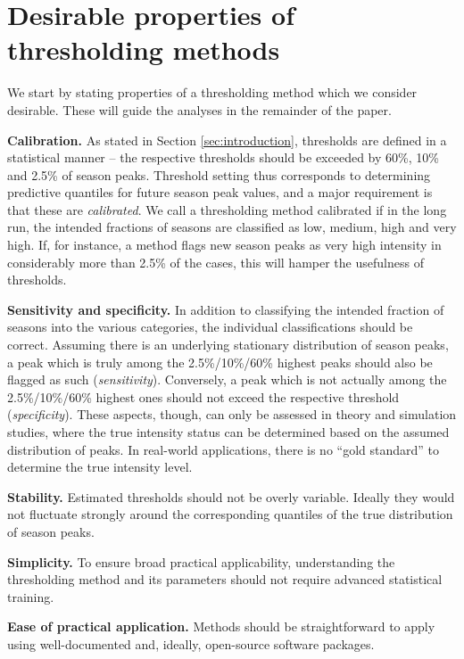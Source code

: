 \documentclass[12pt]{article}
\begin{document}
\section{Desirable properties of thresholding methods}
\label{sec:desirable_properties}

We start by stating properties of a thresholding method which we consider desirable. These will guide the analyses in the remainder of the paper.

\begin{description}
\item \textbf{Calibration.} As stated in Section \ref{sec:introduction}, thresholds are defined in a statistical manner -- the respective thresholds should be exceeded by 60\%, 10\% and 2.5\% of season peaks. Threshold setting thus corresponds to determining predictive quantiles for future season peak values, and a major requirement is that these are \textit{calibrated}. We call a thresholding method calibrated if in the long run, the intended fractions of seasons are classified as low, medium, high and very high. If, for instance, a method flags new season peaks as very high intensity in considerably more than 2.5\% of the cases, this will hamper the usefulness of thresholds.
\item \textbf{Sensitivity and specificity.} In addition to classifying the intended fraction of seasons into the various categories, the individual classifications should be correct. Assuming there is an underlying stationary distribution of season peaks, a peak which is truly among the 2.5\%/10\%/60\% highest peaks should also be flagged as such (\textit{sensitivity}). Conversely, a peak which is not actually among the 2.5\%/10\%/60\% highest ones should not exceed the respective threshold (\textit{specificity}). These aspects, though, can only be assessed in theory and simulation studies, where the true intensity status can be determined based on the assumed distribution of peaks. In real-world applications, there is no ``gold standard'' to determine the true intensity level.
\item \textbf{Stability.} Estimated thresholds should not be overly variable. Ideally they would not fluctuate strongly around the corresponding quantiles of the true distribution of season peaks.
\item \textbf{Simplicity.} To ensure broad practical applicability, understanding the thresholding method and its parameters should not require advanced statistical training.
\item \textbf{Ease of practical application.} Methods should be straightforward to apply using well-documented and, ideally, open-source software packages.
\end{description}
\end{document}
